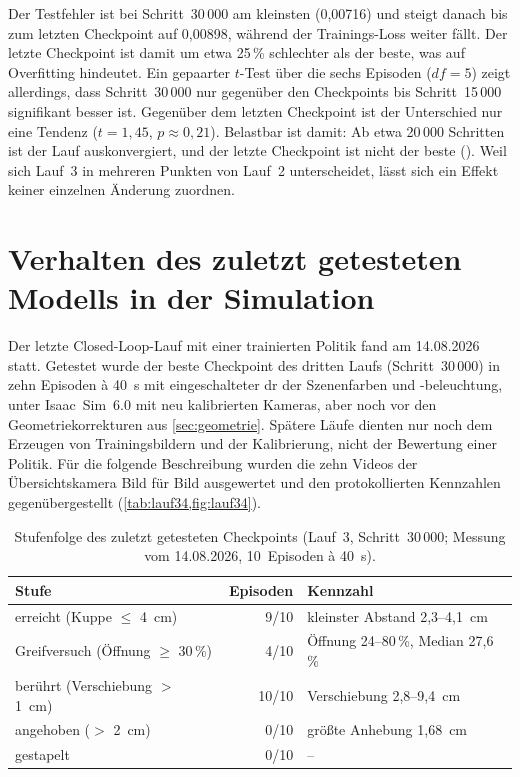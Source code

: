Der Testfehler ist bei Schritt~30\,000 am kleinsten (0,00716) und steigt danach
bis zum letzten Checkpoint auf 0,00898, während der Trainings-Loss weiter
fällt. Der letzte Checkpoint ist damit um etwa 25\,\% schlechter als der
beste, was auf Overfitting hindeutet. Ein gepaarter $t$-Test über die sechs
Episoden ($\mathit{df} = 5$) zeigt allerdings, dass Schritt~30\,000 nur
gegenüber den Checkpoints bis Schritt~15\,000 signifikant besser ist. Gegenüber
dem letzten Checkpoint ist der Unterschied nur eine Tendenz ($t = 1{,}45$,
$p \approx 0{,}21$). Belastbar ist damit: Ab etwa 20\,000 Schritten ist der
Lauf auskonvergiert, und der letzte Checkpoint ist nicht der beste
(). Weil sich Lauf~3 in
mehreren Punkten von Lauf~2 unterscheidet, lässt sich ein Effekt keiner einzelnen
Änderung zuordnen.

\section{Verhalten des zuletzt getesteten Modells in der Simulation}
\label{sec:realperformance}

Der letzte Closed-Loop-Lauf mit einer trainierten Politik fand am 14.08.2026
statt. Getestet wurde der beste Checkpoint des dritten Laufs (Schritt~30\,000)
in zehn Episoden à 40~s mit eingeschalteter \ac{dr} der Szenenfarben und
-beleuchtung, unter Isaac~Sim~6.0 mit neu kalibrierten Kameras, aber noch vor
den Geometriekorrekturen aus \cref{sec:geometrie}. Spätere Läufe dienten nur
noch dem Erzeugen von Trainingsbildern und der Kalibrierung, nicht der
Bewertung einer Politik. Für die folgende Beschreibung wurden die zehn Videos
der Übersichtskamera Bild für Bild ausgewertet und den protokollierten
Kennzahlen gegenübergestellt (\cref{tab:lauf34,fig:lauf34}).

\begin{table}[htb]
  \centering
  \begin{tabular}{lrl}
    \toprule
    Stufe & Episoden & Kennzahl \\
    \midrule
    erreicht (Kuppe $\le$ 4~cm)       & 9/10  & kleinster Abstand 2,3--4,1~cm \\
    Greifversuch (Öffnung $\ge$ 30\,\%) & 4/10  & Öffnung 24--80\,\%, Median 27,6\,\% \\
    berührt (Verschiebung $>$ 1~cm)   & 10/10 & Verschiebung 2,8--9,4~cm \\
    angehoben ($>$ 2~cm)              & 0/10  & größte Anhebung 1,68~cm \\
    gestapelt                         & 0/10  & -- \\
    \bottomrule
  \end{tabular}
  \caption{Stufenfolge des zuletzt getesteten Checkpoints (Lauf~3,
    Schritt~30\,000; Messung vom 14.08.2026, 10~Episoden à 40~s).}
  \label{tab:lauf34}
\end{table}

